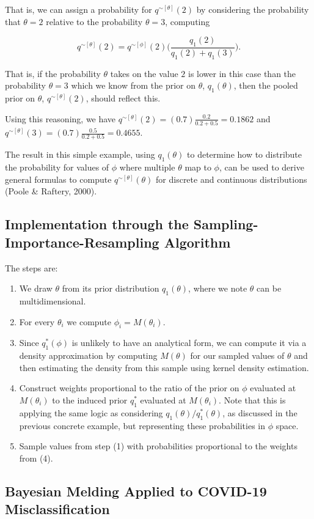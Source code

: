 \documentclass[12pt,twoside]{smiththesis}
\providecommand{\tightlist}{%
  \setlength{\itemsep}{0pt}\setlength{\parskip}{0pt}}
\begin{document}
That is, we can assign a probability for \(q^{\sim[\theta]}(2)\) by considering the probability that \(\theta = 2\) relative to the probability \(\theta =3\), computing

\[q^{\sim[\theta]}(2) = q^{\sim[\phi]}(2) \Big( \frac{q_1(2)}{q_1(2) + q_1(3)}\Big).\]

That is, if the probability \(\theta\) takes on the value \(2\) is lower in this case than the probability \(\theta=3\) which we know from the prior on \(\theta\), \(q_1(\theta)\), then the pooled prior on \(\theta\), \(q^{\sim[\theta]}(2)\), should reflect this.

Using this reasoning, we have \(q^{\sim[\theta]}(2) = (0.7) \frac{0.2}{0.2+0.5} = 0.1862\) and \(q^{\sim[\theta]}(3) = (0.7) \frac{0.5}{0.2+0.5} = 0.4655\).

The result in this simple example, using \(q_1(\theta)\) to determine how to distribute the probability for values of \(\phi\) where multiple \(\theta\) map to \(\phi\), can be used to derive general formulas to compute \(q^{\sim[\theta]}(\theta)\) for discrete and continuous distributions (Poole \& Raftery, 2000).

\hypertarget{implementation-through-the-sampling-importance-resampling-algorithm}{%
\subsection{Implementation through the Sampling-Importance-Resampling Algorithm}\label{implementation-through-the-sampling-importance-resampling-algorithm}}

The steps are:
\begin{enumerate}
\def\labelenumi{\arabic{enumi}.}
\tightlist
\item
  We draw \(\theta\) from its prior distribution \(q_1(\theta)\), where we note \(\theta\) can be multidimensional.
\item
  For every \(\theta_i\) we compute \(\phi_i = M(\theta_i)\).
\item
  Since \(q_1^*(\phi)\) is unlikely to have an analytical form, we can compute it via a density approximation by computing \(M(\theta)\) for our sampled values of \(\theta\) and then estimating the density from this sample using kernel density estimation.
\item
  Construct weights proportional to the ratio of the prior on \(\phi\) evaluated at \(M(\theta_i)\) to the induced prior \(q_1^*\) evaluated at \(M(\theta_i)\). Note that this is applying the same logic as considering \(q_1(\theta)/q^*_1(\theta)\), as discussed in the previous concrete example, but representing these probabilities in \(\phi\) space.
\item
  Sample values from step (1) with probabilities proportional to the weights from (4).
\end{enumerate}
\hypertarget{bayesian-melding-applied-to-covid-19-misclassification}{%
\subsection{Bayesian Melding Applied to COVID-19 Misclassification}\label{bayesian-melding-applied-to-covid-19-misclassification}}
\end{document}
